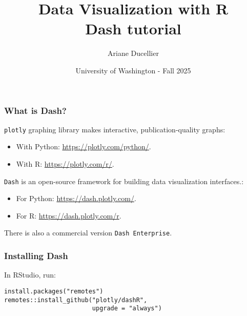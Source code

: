 \documentclass{beamer}
\title[Data Visualization with R - Dash tutorial]{Data Visualization with R \\ Dash tutorial}
\author{Ariane Ducellier}
\date{University of Washington - Fall 2025}
\begin{document}
	\begin{frame}
		\titlepage
	\end{frame}

	\begin{frame}[fragile]
		\frametitle{What is Dash?}

		\verb|plotly| graphing library makes interactive, publication-quality graphs:
		\begin{itemize}
			\item With Python: \href{https://plotly.com/python/}{https://plotly.com/python/}.
			\item With R: \href{https://plotly.com/r/}{https://plotly.com/r/}.
		\end{itemize}

		\vspace{1em}

		\verb|Dash| is an open-source framework for building data visualization interfaces.:
		\begin{itemize}
			\item For Python: \href{https://dash.plotly.com/}{https://dash.plotly.com/}.
			\item For R: \href{https://dash.plotly.com/r}{https://dash.plotly.com/r}.
		\end{itemize}

		\vspace{1em}

		There is also a commercial version \verb|Dash Enterprise|.

	\end{frame}

	\begin{frame}[fragile]
		\frametitle{Installing Dash}

		In RStudio, run:

		\begin{exampleblock}{}
		\begin{BVerbatim}
install.packages("remotes")
remotes::install_github("plotly/dashR",
                        upgrade = "always")
		\end{BVerbatim}
		\end{exampleblock}{}

	\end{frame}
\end{document}
